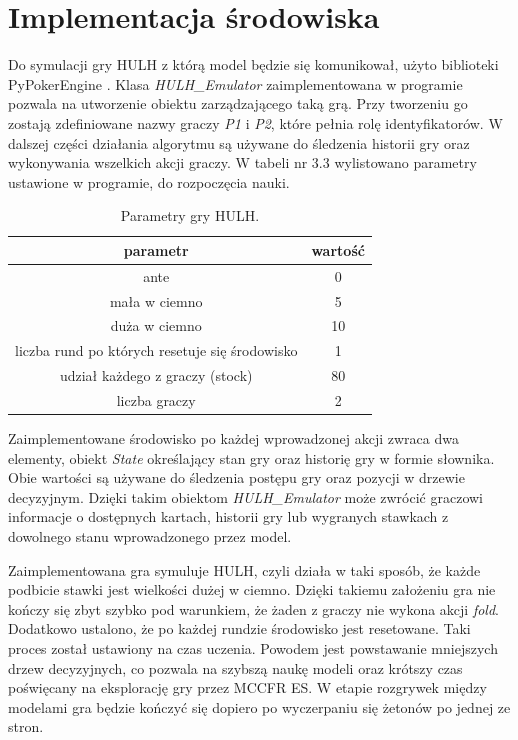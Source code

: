 \documentclass[12pt,oneside,a4paper]{report}
\begin{document}
\section{Implementacja środowiska}

Do symulacji gry HULH z którą model będzie się komunikował, użyto biblioteki PyPokerEngine \cite{PPE}.
Klasa 
\emph{HULH\_Emulator} 
zaimplementowana w programie pozwala na utworzenie obiektu
zarządzającego taką grą. Przy tworzeniu go zostają zdefiniowane 
nazwy graczy \emph{P1} i \emph{P2}, które pełnia rolę identyfikatorów.
W dalszej części działania algorytmu są używane do śledzenia historii gry oraz wykonywania
wszelkich akcji graczy. 
W tabeli nr 3.3 wylistowano parametry ustawione w programie, do rozpoczęcia nauki.


\begin{table}[h!]
\centering
\caption{Parametry gry HULH.}
\begin{tabular}{|c|c| }
   \hline
   parametr & wartość \\
    \hline
   ante & 0  \\ 
   \hline
   mała w ciemno & 5  \\  
   \hline
   duża w ciemno & 10 \\
   \hline
   liczba rund po których resetuje się środowisko & 1  \\
   \hline
   udział każdego z graczy (stock) & 80  \\
   \hline
   liczba graczy & 2 \\
   \hline
\end{tabular}
\end{table}

\vspace{0.5cm}

Zaimplementowane środowisko po każdej wprowadzonej akcji zwraca dwa
elementy, obiekt \emph{State} określający stan gry oraz historię gry w formie słownika. 
Obie wartości są używane do
śledzenia postępu gry oraz pozycji w drzewie decyzyjnym. Dzięki takim obiektom \emph{HULH\_Emulator}
może
zwrócić graczowi informacje o dostępnych kartach, historii gry lub 
wygranych stawkach z dowolnego stanu wprowadzonego przez model.  

Zaimplementowana gra symuluje HULH, czyli działa w taki sposób, że 
każde podbicie stawki jest wielkości
dużej w ciemno. Dzięki takiemu założeniu gra nie kończy się zbyt szybko 
pod warunkiem, że żaden z graczy nie wykona akcji \emph{fold}. Dodatkowo ustalono, że po
każdej 
rundzie środowisko jest resetowane. Taki proces został ustawiony na czas uczenia.
Powodem jest powstawanie mniejszych drzew
decyzyjnych, co pozwala na szybszą naukę modeli oraz krótszy czas poświęcany na eksplorację
gry przez
MCCFR ES. W etapie rozgrywek między modelami gra będzie kończyć się dopiero po wyczerpaniu 
się żetonów po jednej ze stron.
\end{document}
